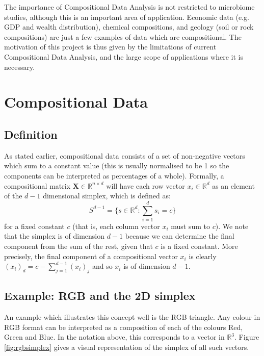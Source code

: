 The importance of Compositional Data Analysis is not restricted to microbiome studies, although this is an important area of application. Economic data (e.g. GDP and wealth distribution), chemical compositions, and geology (soil or rock compositions) are just a few examples of data which are compositional. The motivation of this project is thus given by the limitations of current Compositional Data Analysis, and the large scope of applications where it is necessary.   



\section{Compositional Data}
\label{sec:comp}

\subsection{Definition}
As stated earlier, compositional data consists of a set of non-negative vectors which sum to a constant value (this is usually normalised to be 1 so the components can be interpreted as percentages of a whole). Formally, a compositional matrix $\mathbf{X} \in \mathbb{R}^{n\times d}$ will have each row vector $x_i \in \mathbb{R}^d$ as an element of the $d-1$ dimensional simplex, which is defined as: $$S^{d-1} = \{s \in \mathbb{R}^d : \sum_{i=1}^{d}s_i = c\}$$ for a fixed constant $c$ (that is, each column vector $x_i$ must sum to $c$). We note that the simplex is of dimension $d-1$ because we can determine the final component from the sum of the rest, given that $c$ is a fixed constant. More precisely, the final component of a compositional vector $x_i$ is clearly $(x_i)_{d} =  c - \sum_{j=1}^{d-1}(x_i)_j$ and so $x_i$ is of dimension $d-1$.   


\subsection{Example: RGB and the 2D simplex}
An example which illustrates this concept well is the RGB triangle. Any colour in RGB format can be interpreted as a composition of each of the colours Red, Green and Blue. In the notation above, this corresponds to a vector in $\mathbb{R}^3$.
Figure \ref{fig:rgbsimplex} gives a visual representation of the simplex of all such vectors. 

